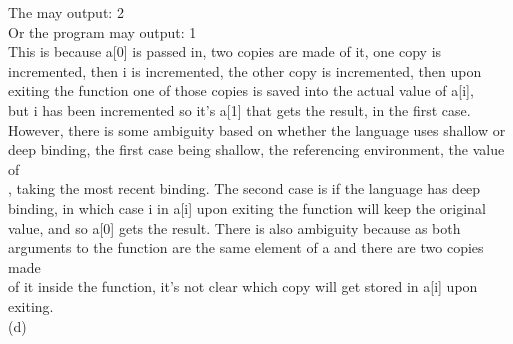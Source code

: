 \documentclass[12pt]{article}
\begin{document}
\begin{flushleft}
\qquad \qquad \qquad \qquad The may output: { 2}\\
\qquad \qquad \qquad \qquad Or the program may output: { 1}\\
[2mm] 
\qquad \qquad \qquad \qquad This is because {\selectfont a[0]} is passed in, two copies are made of it, one copy is\\
\qquad \qquad \qquad \qquad incremented, then {\selectfont i} is incremented, the other copy is incremented, then upon\\
\qquad \qquad \qquad \qquad exiting the function one of those copies is saved into the actual value of {\selectfont a[i]},\\
\qquad \qquad \qquad \qquad  but {\selectfont i} has been incremented so it's {\selectfont a[1]} that gets the result, in the first case.\\
\qquad \qquad \qquad \qquad However, there is some ambiguity based on whether the language uses shallow or\\
\qquad \qquad \qquad \qquad deep binding, the first case being shallow, the referencing environment, the value of\\
\qquad \qquad \qquad {}, taking the most recent binding.  The second case is if the language has deep\\
\qquad \qquad \qquad \qquad binding, in which case {\selectfont i} in {\selectfont a[i]} upon exiting the function will keep the original\\
\qquad \qquad \qquad \qquad value, and so {\selectfont a[0]} gets the result.  There is also ambiguity because as both\\
\qquad \qquad \qquad \qquad  arguments to the function are the same element of {\selectfont a} and there are two copies made\\
\qquad \qquad \qquad \qquad  of it inside the function, it's not clear which copy will get stored in {\selectfont a[i]} upon\\
\qquad \qquad \qquad \qquad exiting.\\
[2mm]

\qquad \qquad \qquad (d)\\


\end{flushleft}
\end{document}
